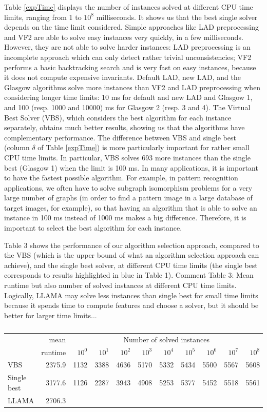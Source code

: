 \documentclass{llncs}
\begin{document}
Table \ref{expTime} displays the number of instances solved at different CPU time limits, ranging
from 1 to $10^8$ milliseconds. It shows us that the best single solver depends on the time limit
considered. Simple approaches like LAD preprocessing and VF2 are able to solve easy instances very
quickly, in a few milliseconds. However, they are not able to solve harder instances: LAD
preprocessing is an incomplete approach which can only detect rather trivial unconsistencies; VF2
performs a basic backtracking search and is very fast on easy instances, because it does not compute
expensive invariants. Default LAD, new LAD, and the Glasgow algorithms solve more instances than VF2
and LAD preprocessing when considering longer time limits: 10 ms for default and new LAD and Glasgow
1, and 100 (resp. 1000 and 10000) ms for Glasgow 2 (resp. 3 and 4). The Virtual Best Solver (VBS),
which considers the best algorithm for each instance separately, obtains much better results,
showing us that the algorithms have complementary performance. The difference between VBS and single
best (column $\delta$ of Table \ref{expTime}) is more particularly important for rather small CPU
time limits. In particular, VBS solves 693 more instances than the single best (Glasgow 1) when the
limit is 100 ms. In many applications, it is important to have the fastest possible algorithm. For
example, in pattern recognition applications, we often have to solve subgraph isomorphism problems
for a very large number of graphs (in order to find a pattern image in a large database of target
images, for example), so that having an algorithm that is able to solve an instance in 100 ms
instead of 1000 ms makes a big difference. Therefore, it is important to select the best algorithm
for each instance.

Table 3 shows the performance of our algorithm selection approach, compared to the VBS (which is the
upper bound of what an algorithm selection approach can achieve), and the single best solver, at
different CPU time limits (the single best corresponds to results highlighted in blue in Table 1).
Comment Table 3: Mean runtime but also number of solved instances at different CPU time limits.
Logically, LLAMA may solve less instances than single best for small time limits because it spends
time to compute features and choose a solver, but it should be better for larger time limits...

\begin{table}
\begin{tabular}{|l|r|rrrrrrrrr|}
&mean & \multicolumn{9}{c|}{Number of solved instances}\\
&runtime & $10^0$ &  $10^1$ &  $10^2$ &  $10^3$ &  $10^4$ &  $10^5$ &  $10^6$ &  $10^7$ &  $10^8$\\\hline
VBS & 2375.9 & 1132 & 3388 & 4636 & 5170 & 5332 & 5434 & 5500 & 5567 & 5608\\\hline
Single best & 3177.6 & 1126 & 2287 & 3943 & 4908 & 5253 & 5377 & 5452 & 5518 & 5561\\\hline
LLAMA & 2706.3\\\hline
\end{tabular}
\caption{}
\end{table}
\end{document}
